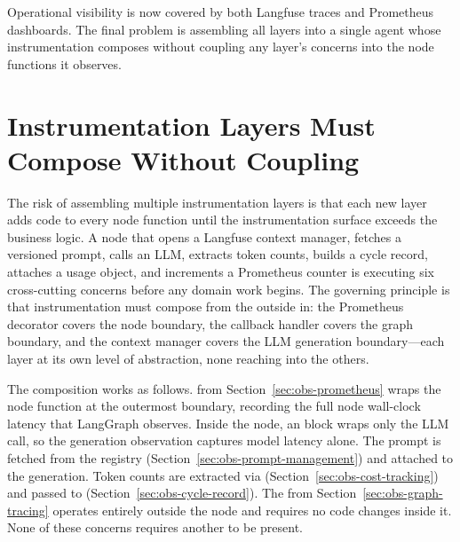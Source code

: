 Operational visibility is now covered by both Langfuse traces and
Prometheus dashboards. The final problem is assembling all layers into
a single agent whose instrumentation composes without coupling any
layer's concerns into the node functions it observes.


\section{Instrumentation Layers Must Compose Without Coupling}
\label{sec:obs-full-integration}

The risk of assembling multiple instrumentation layers is that each
new layer adds code to every node function until the instrumentation
surface exceeds the business logic. A node that opens a Langfuse
context manager, fetches a versioned prompt, calls an LLM, extracts
token counts, builds a cycle record, attaches a usage object, and
increments a Prometheus counter is executing six cross-cutting concerns
before any domain work begins. The governing principle is that
instrumentation must compose from the outside in: the Prometheus
decorator covers the node boundary, the callback handler covers the
graph boundary, and the context manager covers the LLM generation
boundary---each layer at its own level of abstraction, none reaching
into the others.

The composition works as follows.  from
Section~\ref{sec:obs-prometheus} wraps the node function at the
outermost boundary, recording the full node wall-clock latency that
LangGraph observes. Inside the node, an
block wraps only the LLM call, so the generation observation captures
model latency alone. The prompt is fetched from the registry
(Section~\ref{sec:obs-prompt-management}) and attached to the
generation. Token counts are extracted via 
(Section~\ref{sec:obs-cost-tracking}) and passed to
 (Section~\ref{sec:obs-cycle-record}).
The  from Section~\ref{sec:obs-graph-tracing}
operates entirely outside the node and requires no code changes inside
it. None of these concerns requires another to be present.

